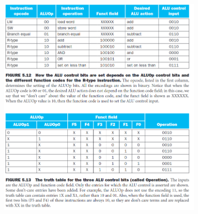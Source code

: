 \documentclass[12pt, a4paper, openany]{book}
\begin{document}
\begin{center}
    \includegraphics[width=100mm, scale=0.5]{ALUOPcode.png}
\end{center}
\end{document}

